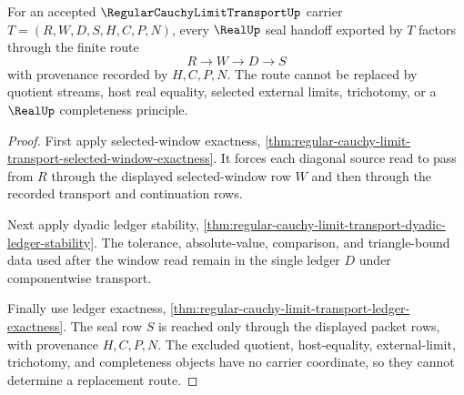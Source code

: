 \begin{theorem}
\label{thm:regular-cauchy-limit-transport-seal-route-determinacy}
For an accepted $\RegularCauchyLimitTransportUp$ carrier $T=(R,W,D,S,H,C,P,N)$, every $\RealUp$ seal handoff exported by $T$ factors through the finite route
$$
R \to W \to D \to S
$$
with provenance recorded by $H,C,P,N$. The route cannot be replaced by quotient streams, host real equality, selected external limits, trichotomy, or a $\RealUp$ completeness principle.
\end{theorem}
\begin{proof}
First apply selected-window exactness, \autoref{thm:regular-cauchy-limit-transport-selected-window-exactness}. It forces each diagonal source read to pass from $R$ through the displayed selected-window row $W$ and then through the recorded transport and continuation rows.

Next apply dyadic ledger stability, \autoref{thm:regular-cauchy-limit-transport-dyadic-ledger-stability}. The tolerance, absolute-value, comparison, and triangle-bound data used after the window read remain in the single ledger $D$ under componentwise transport.

Finally use ledger exactness, \autoref{thm:regular-cauchy-limit-transport-ledger-exactness}. The seal row $S$ is reached only through the displayed packet rows, with provenance $H,C,P,N$. The excluded quotient, host-equality, external-limit, trichotomy, and completeness objects have no carrier coordinate, so they cannot determine a replacement route.
\end{proof}


